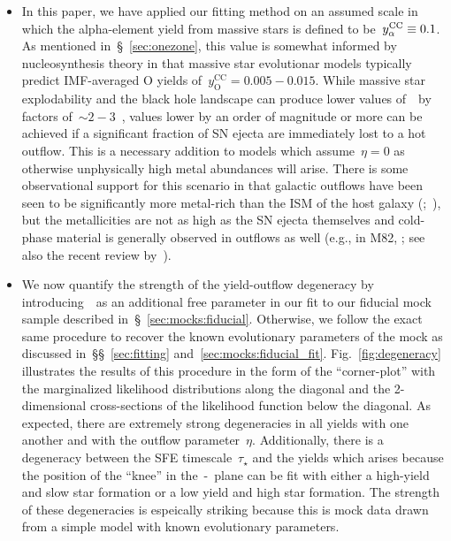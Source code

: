 \documentclass[ms.tex]{subfiles}
\begin{document}
\begin{itemize}
	\item In this paper, we have applied our fitting method on an assumed scale
	in which the alpha-element yield from massive stars is defined to
	be~$y_\alpha^\text{CC} \equiv 0.1$.
	As mentioned in~\S~\ref{sec:onezone}, this value is somewhat informed by
	nucleosynthesis theory in that massive star evolutionar models
	\citep{Nomoto2013, Sukhbold2016, Limongi2018} typically predict
	IMF-averaged O yields of~$y_\text{O}^\text{CC} = 0.005 - 0.015$.
	While massive star explodability and the black hole landscape
	\citep[e.g.][]{OConnor2011, Pejcha2015, Ertl2016, Sukhbold2016} can produce
	lower values of~\yacc~by factors of~$\sim2 - 3$~\citep{Griffith2021},
	values lower by an order of magnitude or more can be achieved if a
	significant fraction of SN ejecta are immediately lost to a hot outflow.
	This is a necessary addition to models which assume~$\eta = 0$ as otherwise
	unphysically high metal abundances will arise.
	There is some observational support for this scenario in that galactic
	outflows have been seen to be significantly more metal-rich than the ISM of
	the host galaxy (\citealp*{Chisholm2018};~\citealp{Cameron2021}), but the
	metallicities are not as high as the SN ejecta themselves and cold-phase
	material is generally observed in outflows as well (e.g., in M82,
	\citealp{Lopez2020}; see also the recent review by~\citealp{Veilleux2020}).

	\item We now quantify the strength of the yield-outflow degeneracy by
	introducing~\yacc~as an additional free parameter in our fit to our
	fiducial mock sample described in~\S~\ref{sec:mocks:fiducial}.
	Otherwise, we follow the exact same procedure to recover the known
	evolutionary parameters of the mock as discussed
	in~\S\S~\ref{sec:fitting} and~\ref{sec:mocks:fiducial_fit}.
	Fig.~\ref{fig:degeneracy} illustrates the results of this procedure in the
	form of the ``corner-plot'' with the marginalized likelihood distributions
	along the diagonal and the 2-dimensional cross-sections of the likelihood
	function below the diagonal.
	As expected, there are extremely strong degeneracies in all yields with
	one another and with the outflow parameter~$\eta$.
	Additionally, there is a degeneracy between the SFE timescale~$\tau_\star$
	and the yields which arises because the position of the ``knee'' in
	the~\afe-\feh~plane can be fit with either a high-yield and slow star
	formation or a low yield and high star formation.
	The strength of these degeneracies is espeically striking because this is
	mock data drawn from a simple model with known evolutionary parameters.


\end{itemize}
\end{document}
